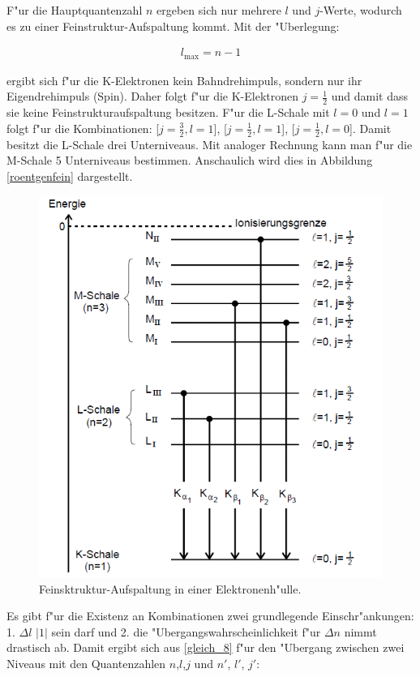 		F"ur die Hauptquantenzahl $n$ ergeben sich nur mehrere $l$ und $j$-Werte, wodurch es zu einer Feinstruktur-Aufspaltung kommt.
		Mit der "Uberlegung:

		\begin{eqnarray*}
			l_\mathrm{max} = n - 1
		\end{eqnarray*}

		ergibt sich f"ur die K-Elektronen kein Bahndrehimpuls, sondern nur ihr Eigendrehimpuls (Spin). 
		Daher folgt f"ur die K-Elektronen $j = \frac{1}{2}$ und damit dass sie keine Fein\-struk\-tur\-auf\-spal\-tung besitzen.
		F"ur die L-Schale mit $l = 0$ und $l = 1$ folgt f"ur die Kombinationen: [$j = \frac{3}{2}, l = 1$], [$j = \frac{1}{2}, l = 1$], [$j = \frac{1}{2}, l = 0$].
		Damit besitzt die L-Schale drei Unterniveaus.
		Mit analoger Rechnung kann man f"ur die M-Schale 5 Unterniveaus bestimmen.
		Anschaulich wird dies in Abbildung \eqref{roentgenfein} dargestellt.

		\begin{figure}[htbp]
			\centering
			\includegraphics[width = 12cm]{img/Roentgenuebergaengefein.png}
			\caption{Feinsktruktur-Aufspaltung in einer Elektronenh"ulle. \cite{anleitung}}
			\label{roentgenfein}
		\end{figure}	

		Es gibt f"ur die Existenz an Kombinationen zwei grundlegende Einschr"ankungen: 
		1. $\Delta l$ \le $|1|$ sein darf und 2. die "Ubergangswahrscheinlichkeit f"ur $\Delta n$  nimmt drastisch ab. 
		Damit ergibt sich aus \eqref{gleich_8} f"ur den "Ubergang zwischen zwei Niveaus mit den Quantenzahlen $n$,$l$,$j$ und $n'$, $l'$, $j'$:	

